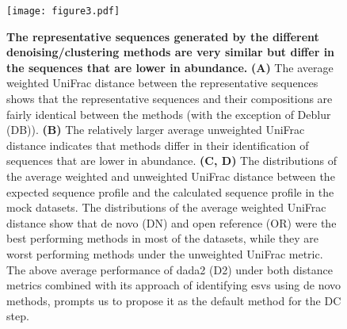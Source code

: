   \begin{figure}
    \centering
    \texttt{[image: figure3.pdf]}
  \end{figure}
  \begin{figure}
    \centering
    \caption{
      \textbf{The representative sequences generated by the different denoising/clustering methods are very similar but differ in the sequences that are lower in abundance.}
      \textbf{(A)} The average weighted UniFrac distance between the representative sequences shows that the representative sequences and their compositions are fairly identical between the methods (with the exception of Deblur (DB)).
      \textbf{(B)} The relatively larger average unweighted UniFrac distance indicates that methods differ in their identification of sequences that are lower in abundance.
      \textbf{(C, D)} The distributions of the average weighted and unweighted UniFrac distance between the expected sequence profile and the calculated sequence profile in the mock datasets.
      The distributions of the average weighted UniFrac distance show that de novo (DN) and open reference (OR) were the best performing methods in most of the datasets, while they are worst performing methods under the unweighted UniFrac metric.
      The above average performance of dada2 (D2) under both distance metrics combined with its approach of identifying \ac{esv}s using de novo methods, prompts us to propose it as the default method for the DC step.
    }
    \label{fig:figure3}
  \end{figure}
  \FloatBarrier
  \newpage

